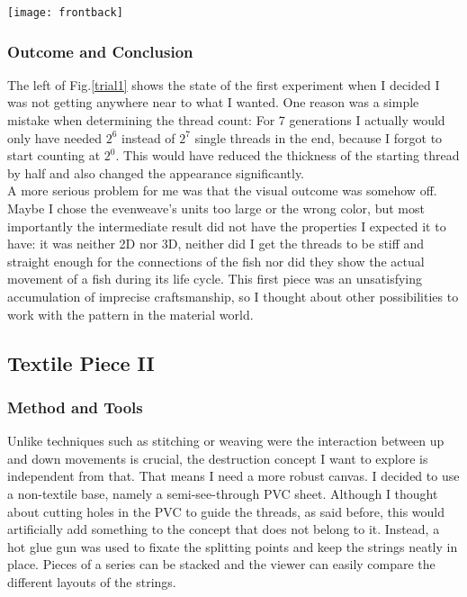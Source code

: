 \documentclass{scrartcl}
\begin{document}
\vspace{0.5cm}
\begin{minipage}[t]{\textwidth}
    \texttt{[image: frontback]}
	\label{trial1}
\end{minipage}
\vspace{0.5cm}

\subsubsection{Outcome and Conclusion}
The left of Fig.\ref{trial1} shows the state of the first experiment when I decided I was not getting anywhere near to what I wanted. One reason was a simple mistake when determining the thread count: For 7 generations I actually would only have needed $2^6$ instead of $2^7$ single threads in the end, because I forgot to start counting at $2^0$. This would have reduced the thickness of the starting thread by half and also changed the appearance significantly.\\
A more serious problem for me was that the visual outcome was somehow off. Maybe I chose the evenweave's units too large or the wrong color, but most importantly the intermediate result did not have the properties I expected it to have: it was neither 2D nor 3D, neither did I get the threads to be stiff and straight enough for the connections of the fish nor did they show the actual movement of a fish during its life cycle.
This first piece was an unsatisfying accumulation of imprecise craftsmanship, so I thought about other possibilities to work with the pattern in the material world.

\subsection{Textile Piece II}
\subsubsection{Method and Tools}
Unlike techniques such as stitching or weaving were the interaction between up and down movements is crucial, the destruction concept I want to explore is independent from that. That means I need a more robust canvas. I decided to use a non-textile base, namely a semi-see-through PVC sheet. Although I thought about cutting holes in the PVC to guide the threads, as said before, this would artificially add something to the concept that does not belong to it. Instead, a hot glue gun was used to fixate the splitting points and keep the strings neatly in place.
Pieces of a series can be stacked and the viewer can easily compare the different layouts of the strings.
\end{document}
